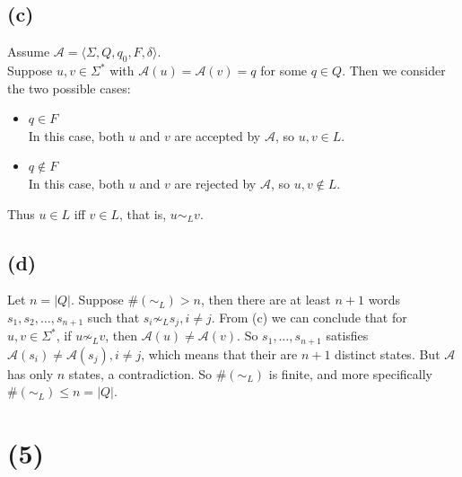 \documentclass{article}
\begin{document}
        \subsection*{(c)}
            Assume $\mathcal{A} = \langle \Sigma, Q, q_0, F, \delta \rangle$. \\
            Suppose $u, v \in \Sigma^*$ with
            $\mathcal{A}(u) = \mathcal{A}(v) = q$ for some $q \in Q$.
            Then we consider the two possible cases:
            \begin{itemize}
                \item $q \in F$ \\
                In this case, both $u$ and $v$ are accepted by $\mathcal{A}$,
                so $u, v \in L$.
                
                \item $q \notin F$ \\
                In this case, both $u$ and $v$ are rejected by $\mathcal{A}$,
                so $u, v \notin L$.
            \end{itemize}
            Thus $u \in L$ iff $v \in L$, that is, $u \sim_L v$.
        
        \subsection*{(d)}
            Let $n = |Q|$. Suppose $\#(\sim_L) > n$,
            then there are at least $n + 1$ words
            $s_1, s_2, \dots, s_{n+1}$ such that $s_i \not\sim_L s_j, i \neq j$.
            From (c) we can conclude that for $u, v \in \Sigma^*$,
            if $u \not\sim_L v$, then $\mathcal{A}(u) \neq \mathcal{A}(v)$.
            So $s_1, \dots, s_{n+1}$ satisfies
            $\mathcal{A}(s_i) \neq \mathcal{A}(s_j), i \neq j$,
            which means that their are $n + 1$ distinct states.
            But $\mathcal{A}$ has only $n$ states, a contradiction.
            So $\#(\sim_L)$ is finite,
            and more specifically $\#(\sim_L) \leq n = |Q|$.
        
    \section*{(5)}
\end{document}
